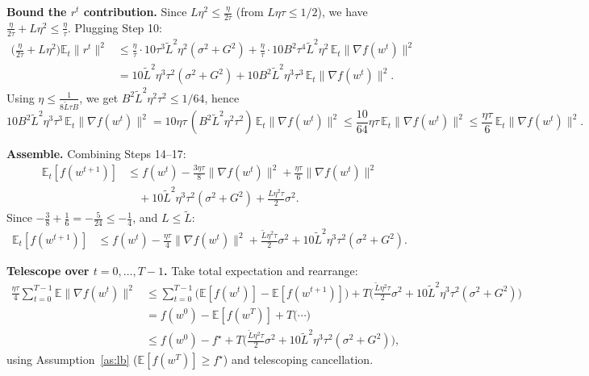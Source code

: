 \documentclass{article}
\begin{document}
\textbf{Bound the $r^t$ contribution.} Since $L\eta^2 \le \frac{\eta}{2\tau}$ (from $L\eta\tau \le 1/2$), we have $\frac{\eta}{2\tau}+L\eta^2 \le \frac{\eta}{\tau}$. Plugging Step 10:
\begin{align}
\Big(\frac{\eta}{2\tau}+L\eta^2\Big)\mathbb{E}_t\|r^t\|^2
&\le \frac{\eta}{\tau}\cdot 10\tau^3\tilde L^2\eta^2(\sigma^2+G^2)
 + \frac{\eta}{\tau}\cdot 10 B^2\tau^4\tilde L^2\eta^2\,\mathbb{E}_t\|\nabla f(w^t)\|^2 \nonumber\\
&= 10\tilde L^2\eta^3\tau^2(\sigma^2+G^2)
 + 10 B^2\tilde L^2\eta^3\tau^3\,\mathbb{E}_t\|\nabla f(w^t)\|^2 .
\tag{Step 16}
\end{align}
Using $\eta \le \frac{1}{8\tilde L\tau B}$, we get $B^2\tilde L^2\eta^2\tau^2 \le 1/64$, hence
\[
10B^2\tilde L^2\eta^3\tau^3\,\mathbb{E}_t\|\nabla f(w^t)\|^2
= 10\eta\tau\,(B^2\tilde L^2\eta^2\tau^2)\,\mathbb{E}_t\|\nabla f(w^t)\|^2
\le \frac{10}{64}\eta\tau\,\mathbb{E}_t\|\nabla f(w^t)\|^2
\le \frac{\eta\tau}{6}\,\mathbb{E}_t\|\nabla f(w^t)\|^2 .
\tag{Step 17}
\]

\textbf{Assemble.} Combining Steps 14--17:
\begin{align}
\mathbb{E}_t[f(w^{t+1})]
&\le f(w^t) - \frac{3\eta\tau}{8}\|\nabla f(w^t)\|^2 + \frac{\eta\tau}{6}\|\nabla f(w^t)\|^2 \nonumber\\
&\quad + 10\tilde L^2\eta^3\tau^2(\sigma^2+G^2) + \frac{L\eta^2\tau}{2}\sigma^2 .
\tag{Step 18}
\end{align}
Since $-\tfrac38 + \tfrac16 = -\tfrac{5}{24} \le -\tfrac14$, and $L \le \tilde L$:
\begin{align}
\mathbb{E}_t[f(w^{t+1})]
&\le f(w^t) - \frac{\eta\tau}{4}\|\nabla f(w^t)\|^2
 + \frac{\tilde L\eta^2\tau}{2}\sigma^2
 + 10\tilde L^2\eta^3\tau^2(\sigma^2+G^2).
\tag{Step 19}
\end{align}

\textbf{Telescope over $t = 0,\dots,T-1$.} Take total expectation and rearrange:
\begin{align}
\frac{\eta\tau}{4}\sum_{t=0}^{T-1}\mathbb{E}\|\nabla f(w^t)\|^2
&\le \sum_{t=0}^{T-1}\Big(\mathbb{E}[f(w^t)] - \mathbb{E}[f(w^{t+1})]\Big)
 + T\Big(\frac{\tilde L\eta^2\tau}{2}\sigma^2 + 10\tilde L^2\eta^3\tau^2(\sigma^2+G^2)\Big) \nonumber\\
&= f(w^0) - \mathbb{E}[f(w^T)] + T\Big(\cdots\Big) \nonumber\\
&\le f(w^0) - f^\star + T\Big(\frac{\tilde L\eta^2\tau}{2}\sigma^2 + 10\tilde L^2\eta^3\tau^2(\sigma^2+G^2)\Big),
\tag{Step 20}
\end{align}
using Assumption~\ref{as:lb} ($\mathbb{E}[f(w^T)]\ge f^\star$) and telescoping cancellation.
\end{document}
